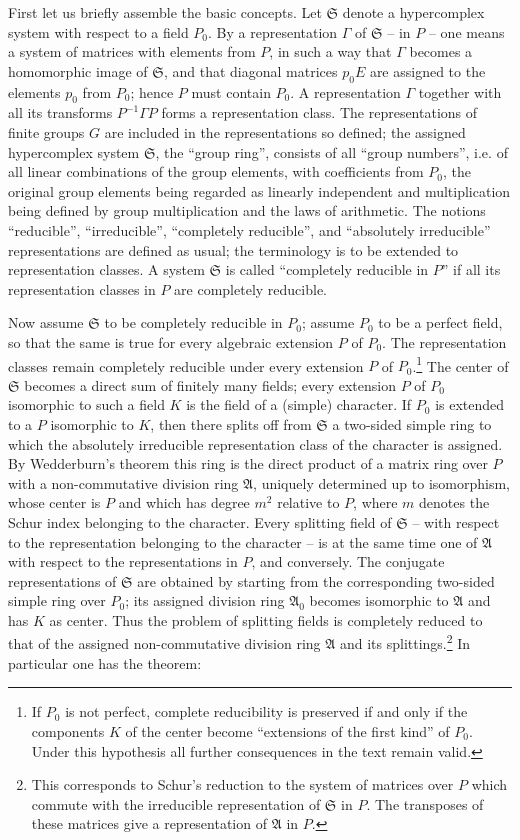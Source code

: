 \documentclass[11pt]{article}
\providecommand{\mS}{\mathfrak{S}}
\providecommand{\mA}{\mathfrak{A}}
\begin{document}
First let us briefly assemble the basic concepts. Let $\mS$ denote a hypercomplex system with respect to a field $P_0$. By a representation $\Gamma$ of $\mS$ -- in $P$ -- one means a system of matrices with elements from $P$, in such a way that $\Gamma$ becomes a homomorphic image of $\mS$, and that diagonal matrices $p_0E$ are assigned to the elements $p_0$ from $P_0$; hence $P$ must contain $P_0$. A representation $\Gamma$ together with all its transforms $P^{-1}\Gamma P$ forms a representation class. The representations of finite groups $G$ are included in the representations so defined; the assigned hypercomplex system $\mS$, the ``group ring'', consists of all ``group numbers'', i.e. of all linear combinations of the group elements, with coefficients from $P_0$, the original group elements being regarded as linearly independent and multiplication being defined by group multiplication and the laws of arithmetic. The notions ``reducible'', ``irreducible'', ``completely reducible'', and ``absolutely irreducible'' representations are defined as usual; the terminology is to be extended to representation classes. A system $\mS$ is called ``completely reducible in $P$'' if all its representation classes in $P$ are completely reducible.

Now assume $\mS$ to be completely reducible in $P_0$; assume $P_0$ to be a perfect field, so that the same is true for every algebraic extension $P$ of $P_0$. The representation classes remain completely reducible under every extension $P$ of $P_0$.\footnote{If $P_0$ is not perfect, complete reducibility is preserved if and only if the components $K$ of the center become ``extensions of the first kind'' of $P_0$. Under this hypothesis all further consequences in the text remain valid.} The center of $\mS$ becomes a direct sum of finitely many fields; every extension $P$ of $P_0$ isomorphic to such a field $K$ is the field of a (simple) character. If $P_0$ is extended to a $P$ isomorphic to $K$, then there splits off from $\mS$ a two-sided simple ring to which the absolutely irreducible representation class of the character is assigned. By Wedderburn's theorem this ring is the direct product of a matrix ring over $P$ with a non-commutative division ring $\mA$, uniquely determined up to isomorphism, whose center is $P$ and which has degree $m^2$ relative to $P$, where $m$ denotes the Schur index belonging to the character. Every splitting field of $\mS$ -- with respect to the representation belonging to the character -- is at the same time one of $\mA$ with respect to the representations in $P$, and conversely. The conjugate representations of $\mS$ are obtained by starting from the corresponding two-sided simple ring over $P_0$; its assigned division ring $\mA_0$ becomes isomorphic to $\mA$ and has $K$ as center. Thus the problem of splitting fields is completely reduced to that of the assigned non-commutative division ring $\mA$ and its splittings.\footnote{This corresponds to Schur's reduction to the system of matrices over $P$ which commute with the irreducible representation of $\mS$ in $P$. The transposes of these matrices give a representation of $\mA$ in $P$.} In particular one has the theorem:
\end{document}
